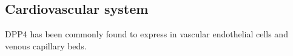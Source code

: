 \subsection{Cardiovascular system}
DPP4 has been commonly found to express in vascular endothelial cells and venous capillary beds.~